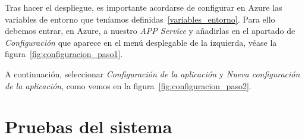 Tras hacer el despliegue, es importante acordarse de configurar en Azure las variables de entorno que teníamos definidas~\ref{variables_entorno}. Para ello debemos entrar, en Azure, a nuestro \textit{APP Service} y añadirlas en el apartado de \textit{Configuración} que aparece en el menú desplegable de la izquierda,  véase la figura~\ref{fig:configuracion_paso1}.

A continuación, seleccionar \textit{Configuración de la aplicación} y \textit{Nueva configuración de la aplicación}, como vemos en la figura~\ref{fig:configuracion_paso2}.

\section{Pruebas del sistema}
